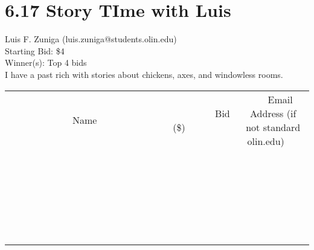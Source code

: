 \documentclass[11pt]{article}
\begin{document}
\section*{6.17 Story TIme with Luis}
Luis F. Zuniga (luis.zuniga@students.olin.edu) \\
Starting Bid: \$4 \\
Winner(s): 
Top 4 bids \\
I have a past rich with stories about chickens, axes, and windowless rooms. \\[6ex]
\begin{tabular}{c c c}
~~~~~~~~~~~~~Name~~~~~~~~~~~~~ & ~~~~~~~~~Bid (\$)~~~~~~~~~ & ~~~Email Address (if not standard olin.edu)~~~ \\
 & & \\
\hline
 & & \\
\hline
 & & \\
\hline
 & & \\
\hline
 & & \\
\hline
 & & \\
\hline
 & & \\
\hline
 & & \\
\hline
 & & \\
\hline
 & & \\
\hline
 & & \\
\hline
 & & \\
\hline
 & & \\
\hline
 & & \\
\hline
 & & \\
\hline
 & & \\
\hline
 & & \\
\hline
 & & \\
\hline
 & & \\
\hline
 & & \\
\hline
 & & \\
\hline
 & & \\
\hline
 & & \\
\hline
 & & \\
\hline
 & & \\
\hline
 & & \\
\hline
\end{tabular}
\clearpage
\end{document}

